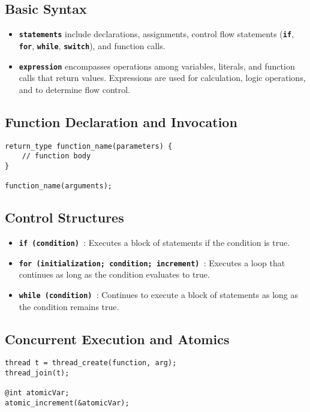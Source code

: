 \documentclass[12pt,a4paper]{article} %
\begin{document}
\subsection{Basic Syntax}
\begin{itemize}
    \item \texttt{\textbf{statements}} include declarations, assignments, control flow statements (\texttt{\textbf{if}}, \texttt{\textbf{for}}, \texttt{\textbf{while}}, \texttt{\textbf{switch}}), and function calls.
    \item \texttt{\textbf{expression}} encompasses operations among variables, literals, and function calls that return values. Expressions are used for calculation, logic operations, and to determine flow control.
\end{itemize}

\subsection{Function Declaration and Invocation}
\begin{verbatim}
return_type function_name(parameters) {
    // function body
}

function_name(arguments);
\end{verbatim}

\subsection{Control Structures}
\begin{itemize}
    \item \texttt{\textbf{if (condition) {}}}: Executes a block of statements if the condition is true.
    \item \texttt{\textbf{for (initialization; condition; increment) {}}}: Executes a loop that continues as long as the condition evaluates to true.
    \item \texttt{\textbf{while (condition) {}}}: Continues to execute a block of statements as long as the condition remains true.
\end{itemize}

\subsection{Concurrent Execution and Atomics}
\begin{verbatim}
thread t = thread_create(function, arg);
thread_join(t);

@int atomicVar;
atomic_increment(&atomicVar);
\end{verbatim}
\end{document}
